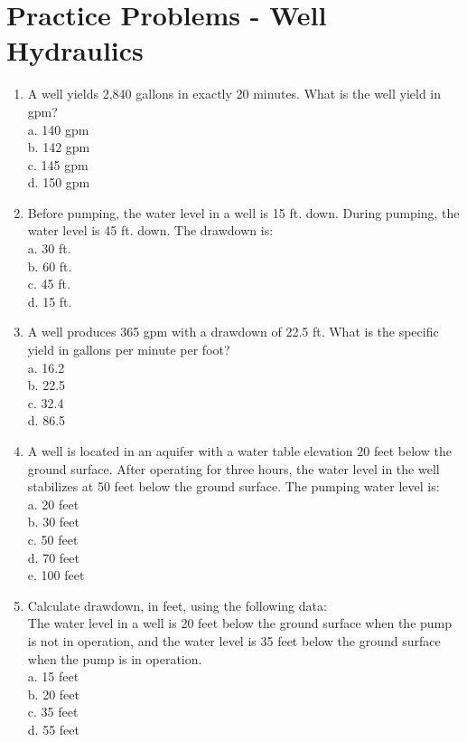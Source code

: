 \section*{Practice Problems - Well Hydraulics}
\begin{enumerate}

\item A well yields 2,840 gallons in exactly 20 minutes. What is the well yield in gpm?\\
a. 140 gpm\\
b. 142 gpm\\
c. 145 gpm\\
d. 150 gpm

\item Before pumping, the water level in a well is 15 ft. down. During pumping, the water level is 45 ft. down. The drawdown is:\\
a. 30 ft.\\
b. 60 ft.\\
c. 45 ft.\\
d. 15 ft.\\

\item A well produces 365 gpm with a drawdown of 22.5 ft.  What is	the specific yield in gallons per minute per foot?\\
a.	16.2\\
b.	22.5\\
c.	32.4\\
d.	86.5\\

\item A well is located in an aquifer with a water table elevation 20 feet below the ground surface. After operating for three hours, the water level in the well stabilizes at 50 feet below the ground surface. The pumping water level is:\\
a.	20 feet\\
b.  30 feet\\
c.	50 feet\\
d.	70 feet\\
e.	100 feet\\

\item Calculate drawdown, in feet, using the following data:\\
The water level in a well is 20 feet below the ground surface when the pump is not in operation, and the water level is 35 feet below the ground surface when the pump is in operation.\\
a.	15 feet\\
b.	20 feet\\
c.	35 feet\\
d.	55 feet\\


\end{enumerate}
